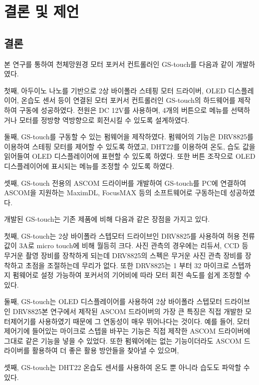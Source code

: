 \section{결론 및 제언}

\subsection{결론}
	
본 연구를 통하여 천체망원경 모터 포커서 컨트롤러인 GS-touch를 다음과 같이 개발하였다. 

첫째, 아두이노 나노를 기반으로 2상 바이폴라 스테핑 모터 드라이버, OLED 디스플레이어, 온습도 센서 등이 연결된 모터 포커서 컨트롤러인 GS-touch의 하드웨어를 제작하여 구동에 성공하였다. 전원은 DC 12V를 사용하며, 4개의 버튼으로 메뉴를 선택하거나 모터를 정방향 역방향으로 회전시킬 수 있도록 설계하였다.

둘째, GS-touch를 구동할 수 있는 펌웨어을 제작하였다. 펌웨어의 기능은 DRV8825를 이용하여 스테핑 모터를 제어할 수 있도록 하였고, DHT22를 이용하여 온도, 습도 값을 읽어들여 OLED 디스플레이어에 표현할 수 있도록 하였다. 또한 버튼 조작으로 OLED 디스플레이어에 표시되는 메뉴를 조정할 수 있도록 하였다. 

셋째, GS-touch 전용의 ASCOM 드라이버를 개발하여 GS-touch를 PC에 연결하여 ASCOM을 지원하는 MaximDL, FocusMAX 등의 소프트웨어로 구동하는데 성공하였다.

개발된 GS-touch는 기존 제품에 비해 다음과 같은 장점을 가지고 있다. 

첫째, GS-touch는 2상 바이폴라 스텝모터 드라이브인 DRV8825를 사용하여 허용 전류 값이 $3 \textrm{A}$로 micro touch에 비해 월등히 크다. 사진 관측의 경우에는 리듀서, CCD 등 무거운 촬영 장비를 장착하게 되는데 DRV8825의 스펙은 무거운 사진 관측 장비를 장착하고 초점을 조절하는데 무리가 없다. 또한 DRV8825는 1 부터 32 마이크로 스텝까지 펌웨어로 설정 가능하여 포커서의 기어비에 따라 모터 회전 속도를 쉽게 조정할 수 있다. 

둘째, GS-touch는 OLED 디스플레이어를 사용하여 2상 바이폴라 스텝모터 드라이브인 DRV8825본 연구에서 제작된 ASCOM 드라이버의 가장 큰 특징은 직접 개발한 모터제어기를 사용하였기 때문에 그 연동성이 매우 뛰어나다는 것이다. 예를 들어, 모터제어기에 들어있는 마이크로 스텝을 바꾸는 기능은 직접 제작한 ASCOM 드라이버에 그대로 같은 기능을 넣을 수 있었다. 또한 펌웨어에는 없는 기능이더라도 ASCOM 드라이버를 활용하여 더 좋은 활용 방안들을 찾아낼 수 있으며, 

셋째, GS-touch는 DHT22 온습도 센서를 사용하여 온도 뿐 아니라 습도도 파악할 수 있다. 

